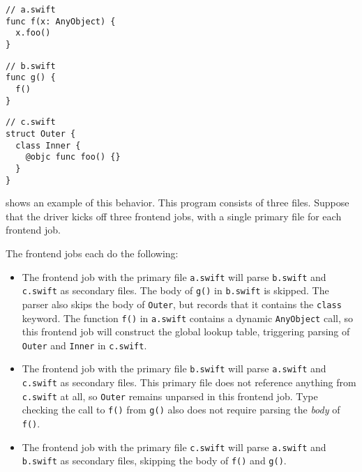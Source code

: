 \documentclass[../generics]{subfiles}
\begin{document}
\begin{listing}[b!]\label{anyobjectdelayedparse}
\begin{Verbatim}
// a.swift
func f(x: AnyObject) {
  x.foo()
}
\end{Verbatim}

\begin{Verbatim}
// b.swift
func g() {
  f()
}
\end{Verbatim}

\begin{Verbatim}
// c.swift
struct Outer {
  class Inner {
    @objc func foo() {}
  }
}
\end{Verbatim}
\end{listing}

\begin{example}\label{anyobjectdelayedparseex}
 shows an example of this behavior. This program consists of three files. Suppose that the driver kicks off three frontend jobs, with a single primary file for each frontend job.

The frontend jobs each do the following:
\begin{itemize}
\item The frontend job with the primary file \texttt{a.swift} will parse \texttt{b.swift} and \texttt{c.swift} as secondary files. The body of \texttt{g()} in \texttt{b.swift} is skipped. The parser also skips the body of \texttt{Outer}, but records that it contains the \texttt{class} keyword. The function \texttt{f()} in \texttt{a.swift} contains a dynamic \texttt{AnyObject} call, so this frontend job will construct the global lookup table, triggering parsing of \texttt{Outer} and \texttt{Inner} in \texttt{c.swift}.
\item The frontend job with the primary file \texttt{b.swift} will parse \texttt{a.swift} and \texttt{c.swift} as secondary files. This primary file does not reference anything from \texttt{c.swift} at all, so \texttt{Outer} remains unparsed in this frontend job. Type checking the call to \texttt{f()} from \texttt{g()} also does not require parsing the \emph{body} of \texttt{f()}.
\item The frontend job with the primary file \texttt{c.swift} will parse \texttt{a.swift} and \texttt{b.swift} as secondary files, skipping the body of \texttt{f()} and \texttt{g()}.
\end{itemize}
\end{example}
\end{document}
